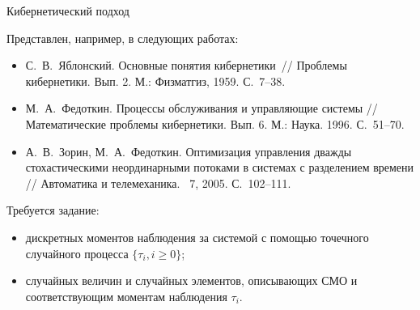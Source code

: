 \documentclass[10pt]{beamer}
\begin{document}
\begin{frame}[allowframebreaks]{Кибернетический подход}
\begin{block}{}
Представлен, например, в следующих работах:
\begin{itemize}
\item  С.~В.~Яблонский. Основные понятия кибернетики~// Проблемы
  кибернетики. Вып. 2. М.: Физматгиз, 1959. С.~7--38.
\item М.~А.~Федоткин. Процессы обслуживания и
  управляющие системы // Математические проблемы
  кибернетики. Вып. 6. М.: Наука. 1996. С.~51--70.
\item А.~В.~Зорин, М.~А.~Федоткин. Оптимизация управления дважды
  стохастическими неординарными потоками в системах с разделением
  времени // Автоматика и телемеханика. \No~7, 2005. С.~102--111.
\end{itemize}
\end{block}

  \framebreak

Требуется задание:
\begin{itemize}
\item дискретных моментов наблюдения за системой с помощью точечного случайного процесса $\{\tau_i, i\geqslant0\}$;
\item случайных величин и случайных элементов, описывающих СМО и соответствующим моментам наблюдения $\tau_i$.
\end{itemize}


\end{frame}
\end{document}
